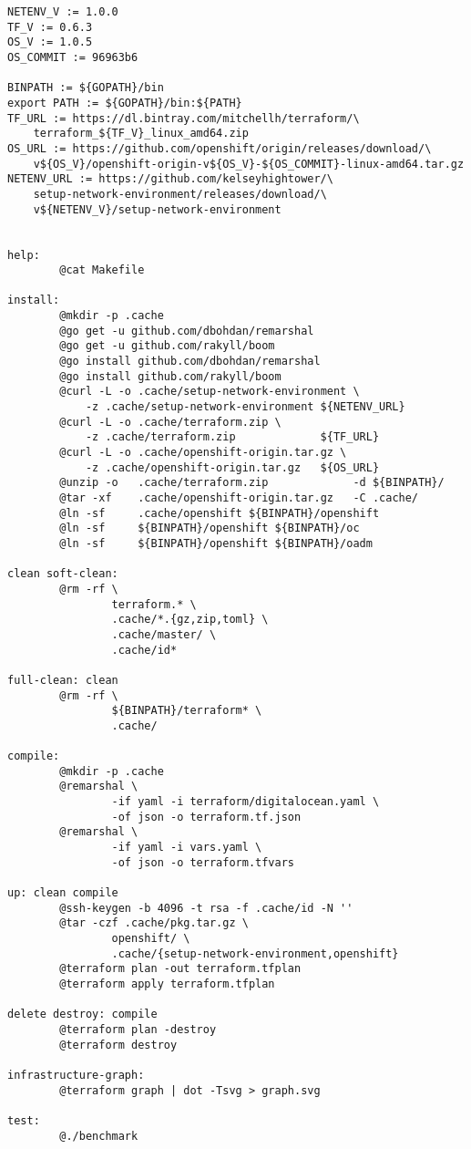 \begin{verbatim}
NETENV_V := 1.0.0
TF_V := 0.6.3
OS_V := 1.0.5
OS_COMMIT := 96963b6

BINPATH := ${GOPATH}/bin
export PATH := ${GOPATH}/bin:${PATH}
TF_URL := https://dl.bintray.com/mitchellh/terraform/\
    terraform_${TF_V}_linux_amd64.zip
OS_URL := https://github.com/openshift/origin/releases/download/\
    v${OS_V}/openshift-origin-v${OS_V}-${OS_COMMIT}-linux-amd64.tar.gz
NETENV_URL := https://github.com/kelseyhightower/\
    setup-network-environment/releases/download/\
    v${NETENV_V}/setup-network-environment


help:
        @cat Makefile

install:
        @mkdir -p .cache
        @go get -u github.com/dbohdan/remarshal
        @go get -u github.com/rakyll/boom
        @go install github.com/dbohdan/remarshal
        @go install github.com/rakyll/boom
        @curl -L -o .cache/setup-network-environment \
            -z .cache/setup-network-environment ${NETENV_URL}
        @curl -L -o .cache/terraform.zip \
            -z .cache/terraform.zip             ${TF_URL}
        @curl -L -o .cache/openshift-origin.tar.gz \
            -z .cache/openshift-origin.tar.gz   ${OS_URL}
        @unzip -o   .cache/terraform.zip             -d ${BINPATH}/
        @tar -xf    .cache/openshift-origin.tar.gz   -C .cache/
        @ln -sf     .cache/openshift ${BINPATH}/openshift
        @ln -sf     ${BINPATH}/openshift ${BINPATH}/oc
        @ln -sf     ${BINPATH}/openshift ${BINPATH}/oadm

clean soft-clean:
        @rm -rf \
                terraform.* \
                .cache/*.{gz,zip,toml} \
                .cache/master/ \
                .cache/id*

full-clean: clean
        @rm -rf \
                ${BINPATH}/terraform* \
                .cache/

compile:
        @mkdir -p .cache
        @remarshal \
                -if yaml -i terraform/digitalocean.yaml \
                -of json -o terraform.tf.json
        @remarshal \
                -if yaml -i vars.yaml \
                -of json -o terraform.tfvars

up: clean compile
        @ssh-keygen -b 4096 -t rsa -f .cache/id -N ''
        @tar -czf .cache/pkg.tar.gz \
                openshift/ \
                .cache/{setup-network-environment,openshift}
        @terraform plan -out terraform.tfplan
        @terraform apply terraform.tfplan

delete destroy: compile
        @terraform plan -destroy
        @terraform destroy

infrastructure-graph:
        @terraform graph | dot -Tsvg > graph.svg

test:
        @./benchmark
\end{verbatim}

